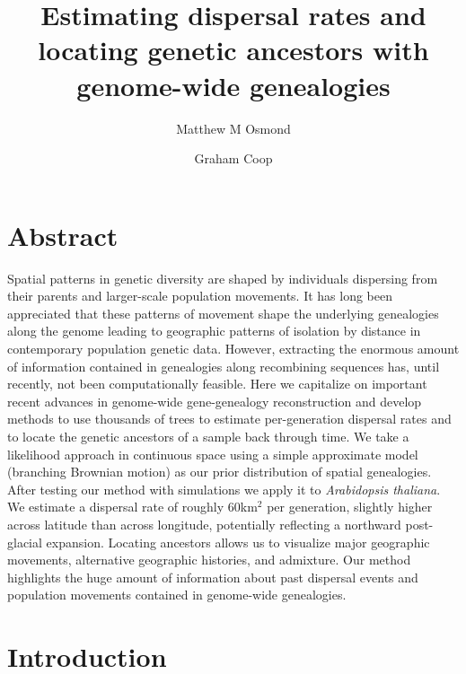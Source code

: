 \documentclass[12pt]{article}
\title{Estimating dispersal rates and locating genetic ancestors with genome-wide genealogies}
\author[1]{Matthew M Osmond}
\author[2]{Graham Coop}
\affil[1]{Department of Ecology \& Evolutionary Biology, University of Toronto}
\affil[2]{Department of Evolution \& Ecology and Center for Population Biology, University of California - Davis}
\date{}
\begin{document}

\maketitle

\section*{Abstract}

Spatial patterns in genetic diversity are shaped by individuals dispersing from their parents and larger-scale population movements. It has long been appreciated that these patterns of movement shape the underlying genealogies along the genome leading to geographic patterns of isolation by distance in contemporary population genetic data. However, extracting the enormous amount of information contained in genealogies along recombining sequences has, until recently, not been computationally feasible. Here we capitalize on important recent advances in genome-wide gene-genealogy reconstruction and develop methods to use thousands of trees to estimate per-generation dispersal rates and to locate the genetic ancestors of a sample back through time. We take a likelihood approach in continuous space using a simple approximate model (branching Brownian motion) as our prior distribution of spatial genealogies. After testing our method with simulations we apply it to \textit{Arabidopsis thaliana}. We estimate a dispersal rate of roughly $60$km$^2$ per generation, slightly higher across latitude than across longitude, potentially reflecting a northward post-glacial expansion. Locating ancestors allows us to visualize major geographic movements, alternative geographic histories, and admixture. Our method highlights the huge amount of information about past dispersal events and population movements contained in genome-wide genealogies.  

\section*{Introduction}
\end{document}
